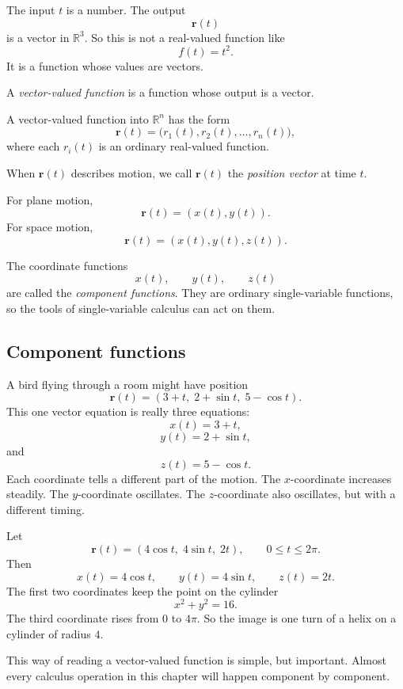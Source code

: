 The input \(t\) is a number.  The output
\[
    \mathbf r(t)
\]
is a vector in \(\mathbb R^3\).  So this is not a real-valued function like
\[
    f(t)=t^2.
\]
It is a function whose values are vectors.

\begin{definition}
A \emph{vector-valued function} is a function whose output is a vector.

A vector-valued function into \(\mathbb R^n\) has the form
\[
    \mathbf r(t)=\bigl(r_1(t),r_2(t),\ldots,r_n(t)\bigr),
\]
where each \(r_i(t)\) is an ordinary real-valued function.

When \(\mathbf r(t)\) describes motion, we call \(\mathbf r(t)\) the \emph{position vector}
at time \(t\).
\end{definition}

For plane motion,
\[
    \mathbf r(t)=(x(t),y(t)).
\]
For space motion,
\[
    \mathbf r(t)=(x(t),y(t),z(t)).
\]

The coordinate functions
\[
    x(t),\qquad y(t),\qquad z(t)
\]
are called the \emph{component functions}.  They are ordinary single-variable functions,
so the tools of single-variable calculus can act on them.

\subsection{Component functions}

A bird flying through a room might have position
\[
    \mathbf r(t)=(3+t,\;2+\sin t,\;5-\cos t).
\]
This one vector equation is really three equations:
\[
    x(t)=3+t,
\]
\[
    y(t)=2+\sin t,
\]
and
\[
    z(t)=5-\cos t.
\]
Each coordinate tells a different part of the motion.  The \(x\)-coordinate increases
steadily.  The \(y\)-coordinate oscillates.  The \(z\)-coordinate also oscillates, but with
a different timing.

\begin{example}
Let
\[
    \mathbf r(t)=(4\cos t,\;4\sin t,\;2t),
    \qquad 0\le t\le 2\pi.
\]
Then
\[
    x(t)=4\cos t,\qquad y(t)=4\sin t,\qquad z(t)=2t.
\]
The first two coordinates keep the point on the cylinder
\[
    x^2+y^2=16.
\]
The third coordinate rises from \(0\) to \(4\pi\).  So the image is one turn of a helix
on a cylinder of radius \(4\).
\end{example}

This way of reading a vector-valued function is simple, but important.  Almost every
calculus operation in this chapter will happen component by component.

